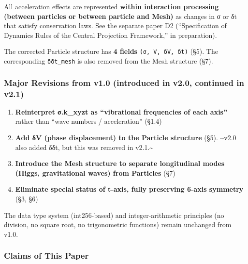 \documentclass[a4paper,11pt]{article}
\providecommand{\tightlist}{\setlength{\itemsep}{0pt}\setlength{\parskip}{0pt}}
\begin{document}
All acceleration effects are represented \textbf{within interaction
processing (between particles or between particle and Mesh)} as changes
in σ or δt that satisfy conservation laws. See the separate paper D2
(``Specification of Dynamics Rules of the Central Projection
Framework,'' in preparation).

The corrected Particle structure has \textbf{4 fields}
\texttt{(σ,\ V,\ δV,\ δt)} (§5). The corresponding \texttt{δδt\_mesh} is
also removed from the Mesh structure (§7).

\subsubsection{Major Revisions from v1.0 (introduced in v2.0, continued
in
v2.1)}\label{major-revisions-from-v1.0-introduced-in-v2.0-continued-in-v2.1}

\begin{enumerate}
\def\labelenumi{\arabic{enumi}.}
\tightlist
\item
  \textbf{Reinterpret σ.k\_xyzt as ``vibrational frequencies of each
  axis''} rather than ``wave numbers / acceleration'' (§1.4)
\item
  \textbf{Add δV (phase displacement) to the Particle structure} (§5).
  \textasciitilde v2.0 also added δδt, but this was removed in
  v2.1.\textasciitilde{}
\item
  \textbf{Introduce the Mesh structure to separate longitudinal modes
  (Higgs, gravitational waves) from Particles} (§7)
\item
  \textbf{Eliminate special status of t-axis, fully preserving 6-axis
  symmetry} (§3, §6)
\end{enumerate}

The data type system (int256-based) and integer-arithmetic principles
(no division, no square root, no trigonometric functions) remain
unchanged from v1.0.

\subsubsection{Claims of This Paper}\label{claims-of-this-paper}
\end{document}
